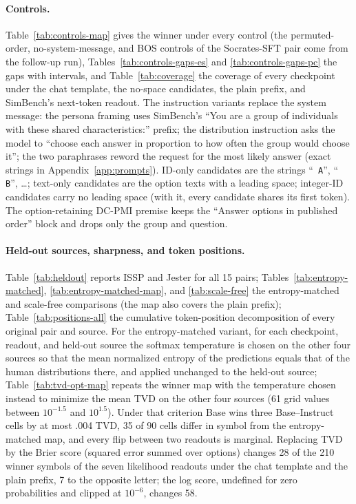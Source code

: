 \documentclass[11pt]{article}
\begin{document}
\paragraph{Controls.}
Table~\ref{tab:controls-map} gives the winner under every control (the
permuted-order, no-system-message, and BOS controls of the Socrates-SFT pair
come from the follow-up run),
Tables~\ref{tab:controls-gaps-es} and \ref{tab:controls-gaps-pc} the gaps
with intervals, and Table~\ref{tab:coverage} the coverage of every checkpoint
under the chat template, the no-space candidates, the plain prefix, and
SimBench's next-token readout. The
instruction variants replace the system message: the persona framing uses
SimBench's ``You are a group of individuals with these shared
characteristics:'' prefix; the distribution instruction asks the model to
``choose each answer in proportion to how often the group would choose it'';
the two paraphrases reword the request for the most likely answer (exact
strings in Appendix~\ref{app:prompts}). ID-only candidates are the strings
``\texttt{ A}'', ``\texttt{ B}'', \ldots; text-only candidates are the option texts with a leading space; integer-ID candidates carry no leading space (with it, every candidate shares its first token). The option-retaining DC-PMI premise
keeps the ``Answer options in published order'' block and drops only the group
and question.

\paragraph{Held-out sources, sharpness, and token positions.}
Table~\ref{tab:heldout} reports ISSP and Jester for all 15 pairs; Tables~\ref{tab:entropy-matched}, \ref{tab:entropy-matched-map}, and
\ref{tab:scale-free} the entropy-matched and scale-free comparisons (the map
also covers the plain prefix);
Table~\ref{tab:positions-all} the cumulative token-position decomposition of
every original pair and source. For the entropy-matched variant, for each
checkpoint, readout, and held-out source the softmax temperature is chosen on
the other four sources so that the mean normalized entropy of the predictions
equals that of the human distributions there, and applied unchanged to the
held-out source; Table~\ref{tab:tvd-opt-map} repeats the winner map with the
temperature chosen instead to minimize the mean TVD on the other four sources
(61 grid values between $10^{-1.5}$ and $10^{1.5}$). Under that criterion Base
wins three Base--Instruct cells by at most .004 TVD, 35 of 90 cells differ in
symbol from the entropy-matched map, and every flip between two readouts is
marginal. Replacing TVD by the Brier score (squared error summed over
options) changes 28 of the 210 winner symbols of the seven likelihood
readouts under the chat template and the plain prefix, 7 to the opposite
letter; the log score, undefined for zero probabilities and clipped at
$10^{-6}$, changes 58.
\end{document}
